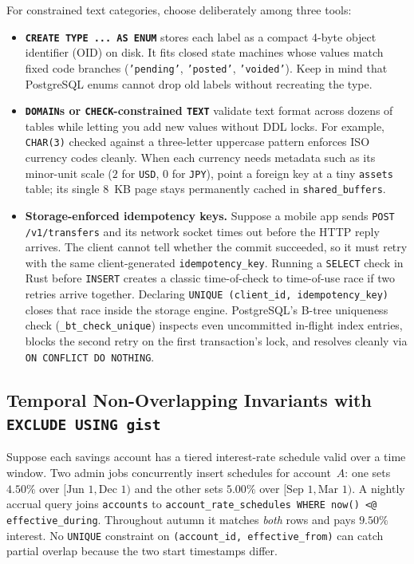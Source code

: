 For constrained text categories, choose deliberately among three tools:
\begin{itemize}
  \item \textbf{\texttt{CREATE TYPE ... AS ENUM}} stores each label as a compact
    4-byte object identifier (OID) on disk. It fits closed state machines whose values match fixed code
    branches (\texttt{'pending'}, \texttt{'posted'}, \texttt{'voided'}). Keep in
    mind that PostgreSQL enums cannot drop old labels without recreating the type.
  \item \textbf{\texttt{DOMAIN}s or \texttt{CHECK}-constrained \texttt{TEXT}}
    validate text format across dozens of tables while letting you add new values
    without DDL locks. For example, \texttt{CHAR(3)} checked against a three-letter
    uppercase pattern enforces ISO currency codes cleanly. When each currency needs
    metadata such as its minor-unit scale ($2$ for \texttt{USD}, $0$ for
    \texttt{JPY}), point a foreign key at a tiny \texttt{assets} table; its single
    8~KB page stays permanently cached in \texttt{shared\_buffers}.
  \item \textbf{Storage-enforced idempotency keys.} Suppose a mobile app sends
    \texttt{POST /v1/transfers} and its network socket times out before the HTTP
    reply arrives. The client cannot tell whether the commit succeeded, so it must
    retry with the same client-generated \texttt{idempotency\_key}. Running a
    \texttt{SELECT} check in Rust before \texttt{INSERT} creates a classic
    time-of-check to time-of-use race if two retries arrive together. Declaring
    \texttt{UNIQUE (client\_id, idempotency\_key)} closes that race inside the
    storage engine. PostgreSQL's B-tree uniqueness check (\texttt{\_bt\_check\_unique})
    inspects even uncommitted in-flight index entries, blocks the second retry on
    the first transaction's lock, and resolves cleanly via
    \texttt{ON CONFLICT DO NOTHING}.
\end{itemize}

\subsection{Temporal Non-Overlapping Invariants with \texttt{EXCLUDE USING gist}}
\label{ch08:gist-exclude}

Suppose each savings account has a tiered interest-rate schedule valid over a time
window. Two admin jobs concurrently insert schedules for account~$A$: one sets
$4.50\%$ over $[\text{Jun~1}, \text{Dec~1})$ and the other sets $5.00\%$ over
$[\text{Sep~1}, \text{Mar~1})$. A nightly accrual query joins \texttt{accounts} to
\texttt{account\_rate\_schedules WHERE now() <@ effective\_during}. Throughout
autumn it matches \emph{both} rows and pays $9.50\%$ interest. No \texttt{UNIQUE}
constraint on \texttt{(account\_id, effective\_from)} can catch partial overlap
because the two start timestamps differ.

